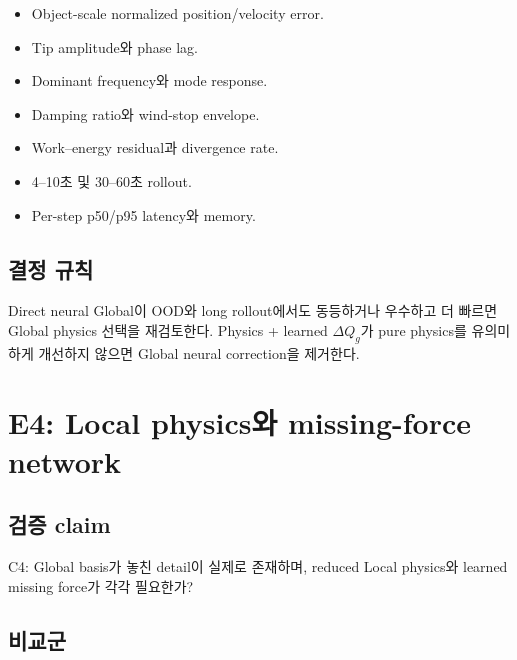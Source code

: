 \documentclass[11pt,a4paper]{article}
\begin{document}
\begin{itemize}[leftmargin=1.5em]
  \item Object-scale normalized position/velocity error.
  \item Tip amplitude와 phase lag.
  \item Dominant frequency와 mode response.
  \item Damping ratio와 wind-stop envelope.
  \item Work--energy residual과 divergence rate.
  \item 4--10초 및 30--60초 rollout.
  \item Per-step p50/p95 latency와 memory.
\end{itemize}

\subsection*{결정 규칙}

Direct neural Global이 OOD와 long rollout에서도 동등하거나 우수하고 더 빠르면
Global physics 선택을 재검토한다.
Physics + learned \(\Delta Q_g\)가 pure physics를 유의미하게 개선하지 않으면
Global neural correction을 제거한다.

\section{E4: Local physics와 missing-force network}

\subsection*{검증 claim}

C4: Global basis가 놓친 detail이 실제로 존재하며,
reduced Local physics와 learned missing force가 각각 필요한가?

\subsection*{비교군}
\end{document}
